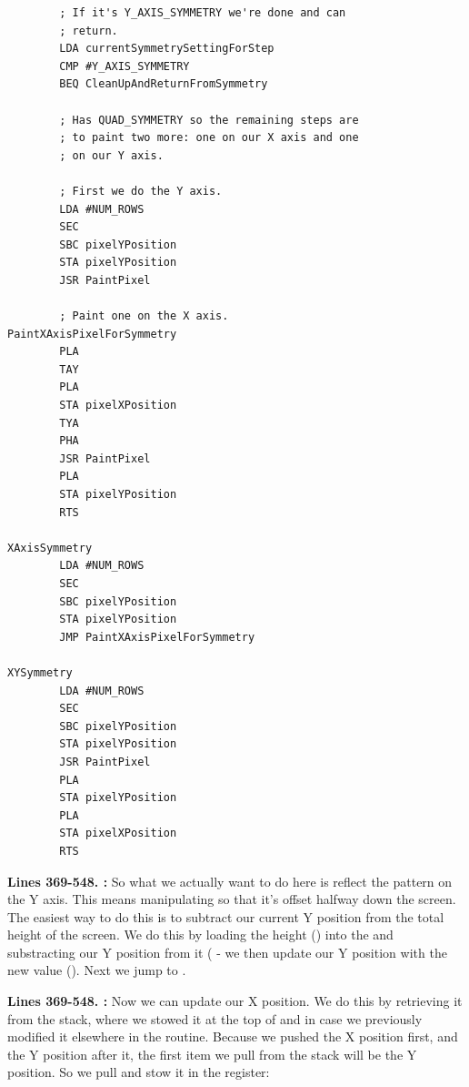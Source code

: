 \clearpage
\begin{lstlisting}
        ; If it's Y_AXIS_SYMMETRY we're done and can 
        ; return.
        LDA currentSymmetrySettingForStep
        CMP #Y_AXIS_SYMMETRY
        BEQ CleanUpAndReturnFromSymmetry

        ; Has QUAD_SYMMETRY so the remaining steps are
        ; to paint two more: one on our X axis and one
        ; on our Y axis.

        ; First we do the Y axis.
        LDA #NUM_ROWS
        SEC 
        SBC pixelYPosition
        STA pixelYPosition
        JSR PaintPixel

        ; Paint one on the X axis.
PaintXAxisPixelForSymmetry    
        PLA 
        TAY 
        PLA 
        STA pixelXPosition
        TYA 
        PHA 
        JSR PaintPixel
        PLA 
        STA pixelYPosition
        RTS 

XAxisSymmetry   
        LDA #NUM_ROWS
        SEC 
        SBC pixelYPosition
        STA pixelYPosition
        JMP PaintXAxisPixelForSymmetry

XYSymmetry   
        LDA #NUM_ROWS
        SEC 
        SBC pixelYPosition
        STA pixelYPosition
        JSR PaintPixel
        PLA 
        STA pixelYPosition
        PLA 
        STA pixelXPosition
        RTS 
\end{lstlisting}
\clearpage

\textbf{Lines 369-548. :} So what we actually want to do here is reflect the pattern on the Y axis. This means manipulating  so that it's
offset halfway down the screen.  The easiest way to do this is to subtract our current Y position from the total height of the screen.
We do this by loading the height () into the  and substracting our Y position from it 
( - we then update our Y position with the new value (). Next we jump to
.

\textbf{Lines 369-548. :} Now we can update our X position. We do this by retrieving it
from the stack, where we stowed it at the top of  and in case we previously modified it elsewhere in the routine. 
Because we pushed the X position first, and the Y position after it, the first item we pull from the stack will be the Y position.
So we pull and stow it in the  register:

